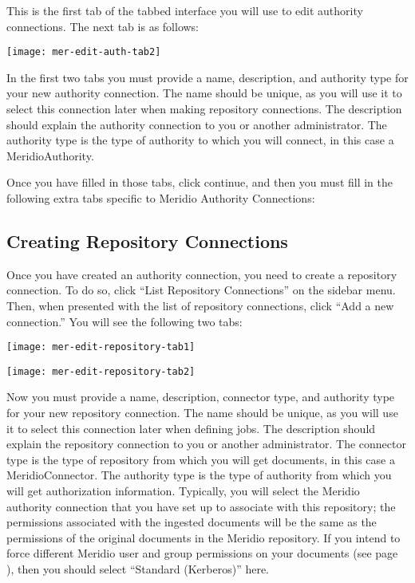 \begin{changemargin}{1.5in}{0in}
This is the first tab of the tabbed interface you will use to edit
authority connections. The next tab is as follows:

\texttt{[image: mer-edit-auth-tab2]}





In the first two tabs you must provide a name, description, and
authority type for your new authority connection. The name should be
unique, as you will use it to select this connection later when making
repository connections. The description should explain the authority
connection to you or another administrator. The authority type is the
type of authority to which you will connect, in this case a
MeridioAuthority.

Once you have filled in those tabs, click continue, and then you must
fill in the following extra tabs specific to Meridio Authority
Connections:



\subsection{Creating Repository Connections}

Once you have created an authority connection, you need to create a
repository connection.
To do so, click ``List Repository Connections'' on the sidebar menu. Then,
when presented with the list of repository connections, click ``Add a
new connection.'' You will see the following two tabs:

\texttt{[image: mer-edit-repository-tab1]}

\texttt{[image: mer-edit-repository-tab2]}

Now you must provide a name, description, connector type, and
authority type for your new repository connection. The name should be
unique, as you will use it to select this connection later when
defining jobs. The description should explain the repository
connection to you or another administrator.  The connector type is the
type of repository from which you will get documents, in this case a
MeridioConnector. The authority type is the type of authority from
which you will get authorization information. Typically, you will
select the Meridio authority connection that you have set up to
associate with this repository; the permissions associated with the
ingested documents will be the same as the permissions of the original
documents in the Meridio repository. If you intend to force different
Meridio user and group permissions on your documents (see page
\pageref{ForceACL}), then you should select ``Standard (Kerberos)''
here. 


\end{changemargin}
